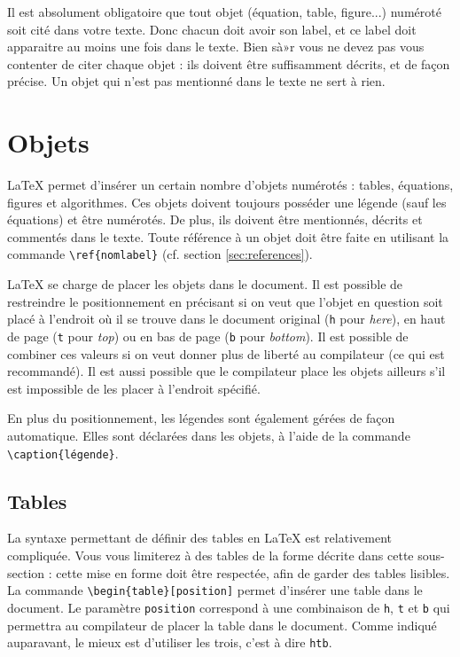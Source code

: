 \documentclass{ceri}
\begin{document}
Il est absolument obligatoire que tout objet (équation, table, figure...) numéroté soit cité dans votre texte. Donc chacun doit avoir son label, et ce label doit apparaitre au moins une fois dans le texte. Bien sà»r vous ne devez pas vous contenter de citer chaque objet : ils doivent être suffisamment décrits, et de façon précise. Un objet qui n'est pas mentionné dans le texte ne sert à rien.



\section{Objets}
\label{sec:objets}
\LaTeX{} permet d'insérer un certain nombre d'objets numérotés : tables, équations, figures et algorithmes. Ces objets doivent toujours posséder une légende (sauf les équations) et être numérotés. De plus, ils doivent être mentionnés, décrits et commentés dans le texte. Toute référence à un objet doit être faite en utilisant la commande \texttt{\textbackslash{}ref\{nomlabel\}} (cf\@. section \ref{sec:references}).
	 
\LaTeX{} se charge de placer les objets dans le document. Il est possible de restreindre le positionnement en précisant si on veut que l'objet en question soit placé à l'endroit où il se trouve dans le document original (\texttt{h} pour \textit{here}), en haut de page (\texttt{t} pour \textit{top}) ou en bas de page (\texttt{b} pour \textit{bottom}). Il est possible de combiner ces valeurs si on veut donner plus de liberté au compilateur (ce qui est recommandé). Il est aussi possible que le compilateur place les objets ailleurs s'il est impossible de les placer à l'endroit spécifié.
	
En plus du positionnement, les légendes sont également gérées de façon automatique. Elles sont déclarées dans les objets, à l'aide de la commande \texttt{\textbackslash{}caption\{légende\}}.
	
\subsection{Tables}
\label{sec:tables}
La syntaxe permettant de définir des tables en \LaTeX{} est relativement compliquée. Vous vous limiterez à des tables de la forme décrite dans cette sous-section : cette mise en forme doit être respectée, afin de garder des tables lisibles. La commande \texttt{\textbackslash{}begin\{table\}[position]} permet d'insérer une table dans le document. Le paramètre \texttt{position} correspond à une combinaison de \texttt{h}, \texttt{t} et \texttt{b} qui permettra au compilateur de placer la table dans le document. Comme indiqué auparavant, le mieux est d'utiliser les trois, c'est à dire \texttt{htb}.
	
\end{document}
